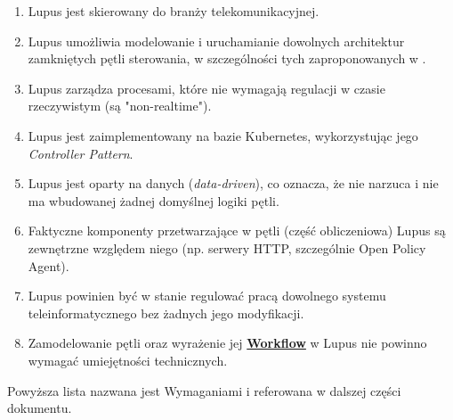 \begin{enumerate}
    \item \label{req:1} Lupus jest skierowany do branży telekomunikacyjnej.
    \item \label{req:2} Lupus umożliwia modelowanie i uruchamianie dowolnych architektur zamkniętych pętli sterowania, w szczególności tych zaproponowanych w \cite{enioverview}.
    \item \label{req:3} Lupus zarządza procesami, które nie wymagają regulacji w czasie rzeczywistym (są "non-realtime").
    \item \label{req:4} Lupus jest zaimplementowany na bazie Kubernetes, wykorzystując jego \textit{Controller Pattern}.
    \item \label{req:5} Lupus jest oparty na danych (\textit{data-driven}), co oznacza, że nie narzuca i nie ma wbudowanej żadnej domyślnej logiki pętli.
    \item \label{req:6} Faktyczne komponenty przetwarzające w pętli (część obliczeniowa) Lupus są zewnętrzne względem niego (np. serwery HTTP, szczególnie Open Policy Agent).
    \item \label{req:7} Lupus powinien być w stanie regulować pracą dowolnego systemu teleinformatycznego bez żadnych jego modyfikacji.
    \item \label{req:8} Zamodelowanie pętli oraz wyrażenie jej \hyperlink{def:workflow-petli}{\textbf{Workflow}} w Lupus nie powinno wymagać umiejętności technicznych.
\end{enumerate}

Powyższa lista nazwana jest Wymaganiami i referowana w dalszej części dokumentu. 

